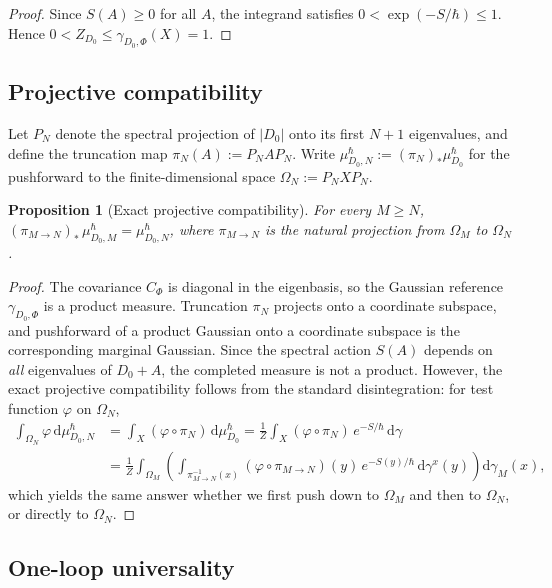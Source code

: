 \documentclass[12pt,a4paper]{article}
\theoremstyle{plain}
\newtheorem{proposition}[theorem]{Proposition}
\theoremstyle{definition}
\theoremstyle{remark}
\newcommand{\dd}{\mathrm{d}}
\begin{document}
\begin{proof}
Since $S(A) \ge 0$ for all $A$, the integrand satisfies
$0 < \exp(-S/\hbar) \le 1$.  Hence $0 < Z_{D_0} \le
\gamma_{D_0,\Phi}(X) = 1$.
\end{proof}

\subsection{Projective compatibility}

Let $P_N$ denote the spectral projection of $|D_0|$ onto its first
$N+1$ eigenvalues, and define the truncation map
$\pi_N(A) := P_N A P_N$.  Write
$\mu_{D_0,N}^\hbar := (\pi_N)_*\mu_{D_0}^\hbar$ for the pushforward
to the finite-dimensional space $\Omega_N := P_N X P_N$.

\begin{proposition}[Exact projective compatibility]
\label{prop:projective}
For every $M \ge N$,
$(\pi_{M \to N})_*\,\mu_{D_0,M}^\hbar = \mu_{D_0,N}^\hbar$,
where $\pi_{M \to N}$ is the natural projection from $\Omega_M$ to
$\Omega_N$.
\end{proposition}

\begin{proof}
The covariance $C_\Phi$ is diagonal in the eigenbasis, so the
Gaussian reference $\gamma_{D_0,\Phi}$ is a product measure.
Truncation $\pi_N$ projects onto a coordinate subspace, and
pushforward of a product Gaussian onto a coordinate subspace is
the corresponding marginal Gaussian.  Since the spectral action
$S(A)$ depends on \emph{all} eigenvalues of $D_0 + A$, the
completed measure is not a product.  However, the exact
projective compatibility follows from the standard disintegration:
for test function $\varphi$ on $\Omega_N$,
\begin{align*}
  \int_{\Omega_N}\varphi\,\dd\mu_{D_0,N}^\hbar
  &= \int_X (\varphi \circ \pi_N)\,\dd\mu_{D_0}^\hbar
  = \frac{1}{Z}\int_X (\varphi\circ\pi_N)\,e^{-S/\hbar}\,\dd\gamma \\
  &= \frac{1}{Z}\int_{\Omega_M}
    \left(\int_{\pi_{M\to N}^{-1}(x)}
      (\varphi\circ\pi_{M\to N})(y)\,e^{-S(y)/\hbar}
    \,\dd\gamma^x(y)\right)\dd\gamma_M(x),
\end{align*}
which yields the same answer whether we first push down to $\Omega_M$
and then to $\Omega_N$, or directly to $\Omega_N$.
\end{proof}

\subsection{One-loop universality}
\label{subsec:one-loop}
\end{document}
